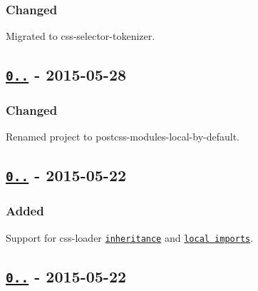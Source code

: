\subsubsection*{Changed}


\begin{DoxyItemize}
\item Migrated to {\ttfamily css-\/selector-\/tokenizer}.
\end{DoxyItemize}

\subsection*{\href{https://github.com/postcss-modules-local-by-default/compare/v0.0.5...v0.0.6}{\tt 0..} -\/ 2015-\/05-\/28}

\subsubsection*{Changed}


\begin{DoxyItemize}
\item Renamed project to {\ttfamily postcss-\/modules-\/local-\/by-\/default}.
\end{DoxyItemize}

\subsection*{\href{https://github.com/postcss-modules-local-by-default/compare/v0.0.4...v0.0.5}{\tt 0..} -\/ 2015-\/05-\/22}

\subsubsection*{Added}


\begin{DoxyItemize}
\item Support for css-\/loader \href{https://github.com/webpack/css-loader#inheriting}{\tt inheritance} and \href{https://github.com/webpack/css-loader#importing-local-class-names}{\tt local imports}.
\end{DoxyItemize}

\subsection*{\href{https://github.com/postcss-modules-local-by-default/compare/v0.0.3...v0.0.4}{\tt 0..} -\/ 2015-\/05-\/22}

